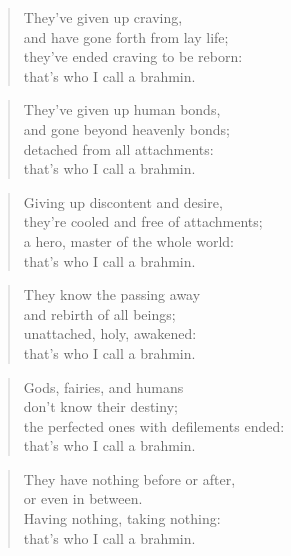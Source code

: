 \documentclass[12pt,openany]{book}%
\begin{document}
\begin{verse}%
They’ve given up craving, \\
and have gone forth from lay life; \\
they’ve ended craving to be reborn: \\
that’s who I call a brahmin. 

%
\end{verse}

\begin{verse}%
They’ve given up human bonds, \\
and gone beyond heavenly bonds; \\
detached from all attachments: \\
that’s who I call a brahmin. 

%
\end{verse}

\begin{verse}%
Giving up discontent and desire, \\
they’re cooled and free of attachments; \\
a hero, master of the whole world: \\
that’s who I call a brahmin. 

%
\end{verse}

\begin{verse}%
They know the passing away \\
and rebirth of all beings; \\
unattached, holy, awakened: \\
that’s who I call a brahmin. 

%
\end{verse}

\begin{verse}%
Gods, fairies, and humans \\
don’t know their destiny; \\
the perfected ones with defilements ended: \\
that’s who I call a brahmin. 

%
\end{verse}

\begin{verse}%
They have nothing before or after, \\
or even in between. \\
Having nothing, taking nothing: \\
that’s who I call a brahmin. 

%
\end{verse}
\end{document}

